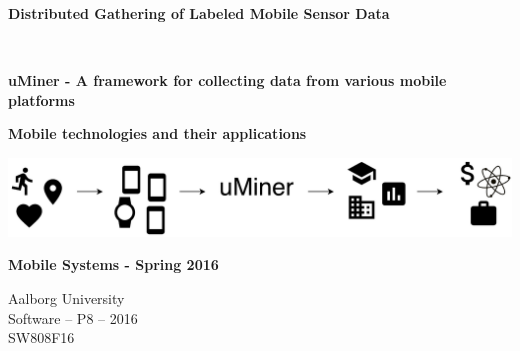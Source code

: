 
\begin{center}
	
	\vspace{8cm}

	\begin{spacing}{2.1}
		\begin{Huge}
			\textbf{Distributed Gathering of Labeled Mobile Sensor Data}
		\end{Huge}
		\\
		\vspace{0.6cm}
		\begin{huge}
			\textbf{uMiner - A framework for collecting data from various mobile platforms}
		\end{huge}
	\end{spacing}

	\vspace{0.6cm}

	\begin{Large}
		\textbf{Mobile technologies and their applications}
	\end{Large}

	\includegraphics[width=\textwidth]{graphic/miscellaneous/front_page.pdf}

	\vspace{1cm}

	\begin{large} 
		\textbf{Mobile Systems - Spring 2016}
	\end{large}

	\vspace*{\fill}

	\vspace*{\fill}

	Aalborg University		\\
	Software -- P8 -- 2016	\\
	SW808F16				\\

\end{center}



\thispagestyle{empty}